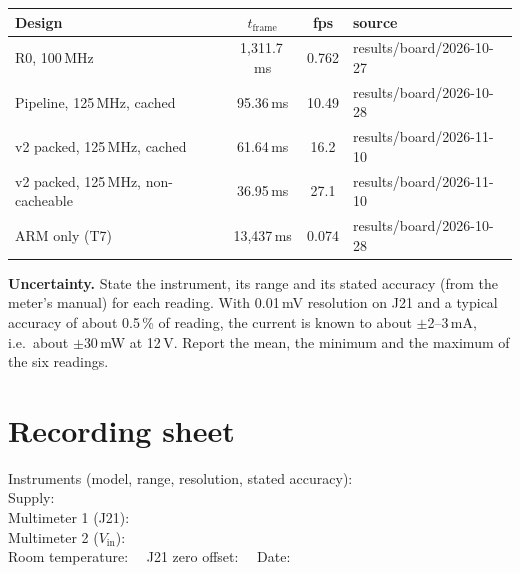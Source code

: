 \documentclass[11pt,a4paper]{article}
\begin{document}
\begin{tabularx}{\textwidth}{@{}lccL@{}}
\toprule
\textbf{Design} & $t_\mathrm{frame}$ & \textbf{fps} & \textbf{source} \\ \midrule
R0, 100\,MHz & 1,311.7\,ms & 0.762 & results/board/2026-10-27 \\
Pipeline, 125\,MHz, cached & 95.36\,ms & 10.49 & results/board/2026-10-28 \\
v2 packed, 125\,MHz, cached & 61.64\,ms & 16.2 & results/board/2026-11-10 \\
v2 packed, 125\,MHz, non-cacheable & 36.95\,ms & 27.1 & results/board/2026-11-10 \\
ARM only (T7) & 13,437\,ms & 0.074 & results/board/2026-10-28 \\
\bottomrule
\end{tabularx}

\medskip
\textbf{Uncertainty.} State the instrument, its range and its stated accuracy (from the meter's manual) for each reading. With 0.01\,mV resolution on J21 and a typical accuracy of about 0.5\,\% of reading, the current is known to about $\pm$2--3\,mA, i.e.\ about $\pm$30\,mW at 12\,V. Report the mean, the minimum and the maximum of the six readings.

\section{Recording sheet}\label{sec:sheet}

Instruments (model, range, resolution, stated accuracy):\\[2pt]
Supply: \makebox[0.75\textwidth]{\dotfill}\\[4pt]
Multimeter 1 (J21): \makebox[0.68\textwidth]{\dotfill}\\[4pt]
Multimeter 2 ($V_\mathrm{in}$): \makebox[0.66\textwidth]{\dotfill}\\[4pt]
Room temperature: \makebox[3cm]{\dotfill}\ \ J21 zero offset: \makebox[3cm]{\dotfill}\ \ Date: \makebox[3cm]{\dotfill}
\end{document}
